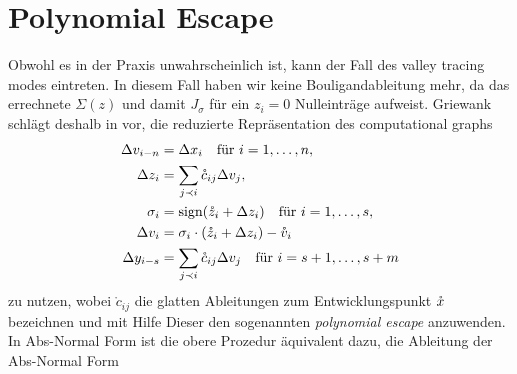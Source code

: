 \section{Polynomial Escape}
Obwohl es in der Praxis unwahrscheinlich ist, kann der Fall des valley tracing modes eintreten.
In diesem Fall haben wir keine Bouligandableitung mehr, da das errechnete $\Sigma(z)$ und damit $J_\sigma$ für ein $z_i=0$ Nulleinträge aufweist. Griewank schlägt deshalb in \cite[S.29]{monster} vor, die reduzierte Repräsentation des computational graphs 
\begin{equation}
 \begin{aligned}
  \Delta v_{i-n} &= \Delta x_i \quad \text{für } i=1,\ldots,n, \\
  \Delta z_i &= \sum_{j\prec i} \mathring c_{ij}\Delta v_j,\\
  \sigma_i& = \text{sign}(\mathring z_i + \Delta z_i) \quad \text{für } i=1,\ldots,s,\\
  \Delta v_i &= \sigma_i \cdot (\mathring z_i+\Delta z_i) - \mathring{v}_i\\
  \Delta y_{i-s}& = \sum_{j\prec i} \mathring c_{ij} \Delta v_j \quad \text{für } i=s+1, \ldots, s+m
 \end{aligned}
 \label{eq:minComputationalGraphRepr}
\end{equation}
zu nutzen, wobei $\mathring c_{ij}$ die glatten Ableitungen zum Entwicklungspunkt $\mathring{x}$ bezeichnen und mit Hilfe Dieser den sogenannten \textit{polynomial escape} anzuwenden. In Abs-Normal Form ist die obere Prozedur äquivalent dazu, die Ableitung der Abs-Normal Form 
